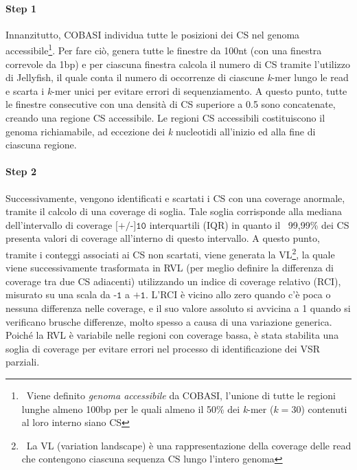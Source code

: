 \documentclass[../main.tex]{subfiles}
\begin{document}
\paragraph{Step 1} Innanzitutto, COBASI individua tutte le posizioni dei CS nel genoma accessibile\footnote{\ Viene definito \textit{genoma accessibile} da COBASI, l'unione di tutte le regioni lunghe almeno 100bp per le quali almeno il 50\% dei \textit{k}-mer ($k = 30$) contenuti al loro interno siano CS}. Per fare ciò, genera tutte le finestre da 100nt (con una finestra correvole da 1bp) e per ciascuna finestra calcola il numero di CS tramite l'utilizzo di Jellyfish, il quale conta il numero di occorrenze di ciascune \textit{k}-mer lungo le read e scarta i \textit{k}-mer unici per evitare errori di sequenziamento. A questo punto, tutte le finestre consecutive con una densità di CS superiore a 0.5 sono concatenate, creando una regione CS accessibile. Le regioni CS accessibili costituiscono il genoma richiamabile, ad eccezione dei \textit{k} nucleotidi all'inizio ed alla fine di ciascuna regione.

\paragraph{Step 2} Successivamente, vengono identificati e scartati i CS con una coverage anormale, tramite il calcolo di una coverage di soglia. Tale soglia corrisponde alla mediana dell'intervallo di coverage $\texttt{[+/-]10}$ interquartili (IQR) in quanto il ~99,99\% dei CS presenta valori di coverage all'interno di questo intervallo. A questo punto, tramite i conteggi associati ai CS non scartati, viene generata la VL\footnote{\ La VL (variation landscape) è una rappresentazione della coverage delle read che contengono ciascuna sequenza CS lungo l'intero genoma}, la quale viene successivamente trasformata in RVL (per meglio definire la differenza di coverage tra due CS adiacenti) utilizzando un indice di coverage relativo (RCI), misurato su una scala da $\texttt{-1}$ a $\texttt{+1}$. L'RCI è vicino allo zero quando c'è poca o nessuna differenza nelle coverage, e il suo valore assoluto si avvicina a 1 quando si verificano brusche differenze, molto spesso a causa di una variazione generica. Poiché la RVL è variabile nelle regioni con coverage bassa, è stata stabilita una soglia di coverage per evitare errori nel processo di identificazione dei VSR parziali.
\end{document}
